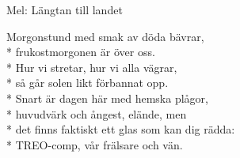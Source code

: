 \begin{SongText}[TREO]
    \begin{SongInfo}
        Mel: Längtan till landet
    \end{SongInfo}
    \begin{SongVerse}
        Morgonstund med smak av döda bävrar,\\*%
        frukostmorgonen är över oss.\\*%
        Hur vi stretar, hur vi alla vägrar,\\*%
        så går solen likt förbannat opp.\\*%
        Snart är dagen här med hemska plågor,\\*%
        huvudvärk och ångest, elände, men\\*%
        det finns faktiskt ett glas som kan dig rädda:\\*%
        TREO-comp, vår frälsare och vän.
    \end{SongVerse}
\end{SongText}
